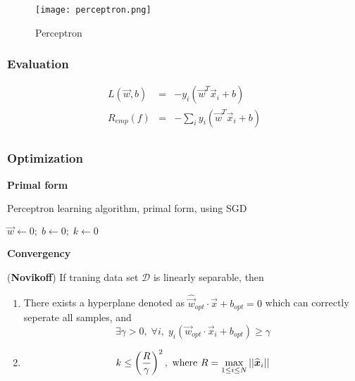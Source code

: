 \begin{figure}[hbtp]
\centering
    \texttt{[image: perceptron.png]}
\caption{Perceptron}
\label{fig:perceptron} 
\end{figure}


\subsubsection{Evaluation}
\begin{eqnarray}
L(\vec{w},b)&=&-y_i(\vec{w}^T\vec{x}_i+b)\\
R_{emp}(f)&=&-\sum\limits_i y_i(\vec{w}^T\vec{x}_i+b)\\
\end{eqnarray}


\subsubsection{Optimization}
\textbf{Primal form}
\begin{algorithm}[htbp]
\caption{Perceptron learning algorithm, primal form, using SGD}
  
    $\vec{w} \leftarrow 0;\; b \leftarrow 0;\; k \leftarrow 0$\;
\end{algorithm}

\textbf{Convergency}
\begin{theorem}
(\textbf{Novikoff}) If traning data set $\mathcal{D}$ is linearly separable, then
\begin{enumerate}
\item There exists a hyperplane denoted as $\widehat{\vec{w}}_{opt} \cdot \vec{x}+b_{opt}=0$ which can correctly seperate all samples, and 
\begin{equation}
\exists\gamma>0,\; \forall i, \; y_i(\vec{w}_{opt} \cdot \vec{x}_i+b_{opt}) \geq \gamma
\end{equation}
\item \begin{equation}k \leq \left(\dfrac{R}{\gamma}\right)^2,\text{ where } R=\max\limits_{1 \leq i \leq N} \abs{\abs{\widehat{\vec{x}}_i}}
\end{equation}
\end{enumerate}
\end{theorem}

